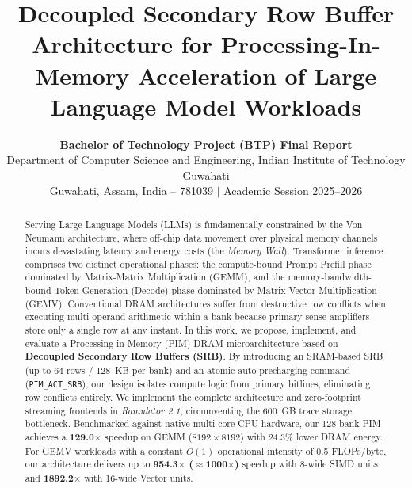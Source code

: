 \documentclass[10pt,twocolumn]{article}
\begin{document}
\title{\textbf{\Large Decoupled Secondary Row Buffer Architecture for Processing-In-Memory Acceleration of Large Language Model Workloads}}

\author{
    \textbf{Bachelor of Technology Project (BTP) Final Report} \\[0.2em]
    \normalsize Department of Computer Science and Engineering, Indian Institute of Technology Guwahati \\
    \footnotesize Guwahati, Assam, India -- 781039 \quad $|$ \quad Academic Session 2025--2026
}

\date{\vspace{-1.8em}}

\maketitle

\begin{abstract}
\noindent Serving Large Language Models (LLMs) is fundamentally constrained by the Von Neumann architecture, where off-chip data movement over physical memory channels incurs devastating latency and energy costs (the \textit{Memory Wall}). Transformer inference comprises two distinct operational phases: the compute-bound Prompt Prefill phase dominated by Matrix-Matrix Multiplication (GEMM), and the memory-bandwidth-bound Token Generation (Decode) phase dominated by Matrix-Vector Multiplication (GEMV). Conventional DRAM architectures suffer from destructive row conflicts when executing multi-operand arithmetic within a bank because primary sense amplifiers store only a single row at any instant. In this work, we propose, implement, and evaluate a Processing-in-Memory (PIM) DRAM microarchitecture based on \textbf{Decoupled Secondary Row Buffers (SRB)}. By introducing an SRAM-based SRB (up to 64 rows / 128~KB per bank) and an atomic auto-precharging command (\texttt{PIM\_ACT\_SRB}), our design isolates compute logic from primary bitlines, eliminating row conflicts entirely. We implement the complete architecture and zero-footprint streaming frontends in \textit{Ramulator 2.1}, circumventing the 600~GB trace storage bottleneck. Benchmarked against native multi-core CPU hardware, our 128-bank PIM achieves a \textbf{129.0$\times$} speedup on GEMM ($8192 \times 8192$) with 24.3\% lower DRAM energy. For GEMV workloads with a constant $O(1)$ operational intensity of 0.5 FLOPs/byte, our architecture delivers up to \textbf{954.3$\times$ ($\approx$1000$\times$)} speedup with 8-wide SIMD units and \textbf{1892.2$\times$} with 16-wide Vector units.
\end{abstract}
\end{document}
